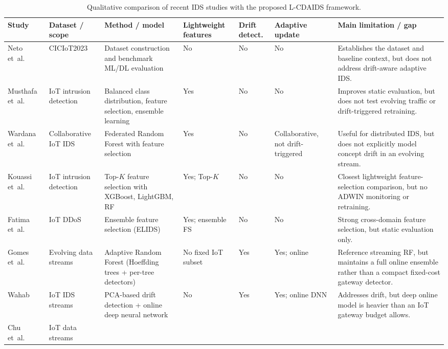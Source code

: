 \documentclass[11pt,a4paper]{article}
\begin{document}
\begin{table}
\centering
\caption{Qualitative comparison of recent IDS studies with the proposed
L-CDAIDS framework.}
\label{tab:related}
\footnotesize
\begin{tabular}{p{2.5cm} p{2.2cm} p{3.4cm} p{1.9cm} p{1.4cm} p{2.2cm} p{4.6cm}}
\toprule
\textbf{Study} & \textbf{Dataset / scope} & \textbf{Method / model} &
\textbf{Light\-weight features} & \textbf{Drift detect.} &
\textbf{Adaptive update} & \textbf{Main limitation / gap} \\
\midrule
Neto et~al.\ \cite{neto2023} & CICIoT2023 & Dataset construction and
benchmark ML/DL evaluation & No & No & No &
Establishes the dataset and baseline context, but does not address
drift-aware adaptive IDS. \\
\addlinespace
Musthafa et~al.\ \cite{musthafa2024} & IoT intrusion detection &
Balanced class distribution, feature selection, ensemble learning &
Yes & No & No &
Improves static evaluation, but does not test evolving traffic or
drift-triggered retraining. \\
\addlinespace
Wardana et~al.\ \cite{wardana2024} & Collaborative IoT IDS &
Federated Random Forest with feature selection & Yes & No &
Collaborative, not drift-triggered &
Useful for distributed IDS, but does not explicitly model concept drift
in an evolving stream. \\
\addlinespace
Kouassi et~al.\ \cite{kouassi2025} & IoT intrusion detection &
Top-$K$ feature selection with XGBoost, LightGBM, RF & Yes; Top-$K$ &
No & No &
Closest lightweight feature-selection comparison, but no ADWIN
monitoring or retraining. \\
\addlinespace
Fatima et~al.\ \cite{fatima2024elids} & IoT DDoS &
Ensemble feature selection (ELIDS) & Yes; ensemble FS & No & No &
Strong cross-domain feature selection, but static evaluation only. \\
\addlinespace
Gomes et~al.\ \cite{gomes2017} & Evolving data streams &
Adaptive Random Forest (Hoeffding trees + per-tree detectors) &
No fixed IoT subset & Yes & Yes; online &
Reference streaming RF, but maintains a full online ensemble rather than
a compact fixed-cost gateway detector. \\
\addlinespace
Wahab \cite{wahab2022} & IoT IDS streams &
PCA-based drift detection + online deep neural network & No & Yes &
Yes; online DNN &
Addresses drift, but deep online model is heavier than an IoT gateway
budget allows. \\
\addlinespace
Chu et~al.\ \cite{chu2023} & IoT data streams &

\end{tabular}
\end{table}
\end{document}
